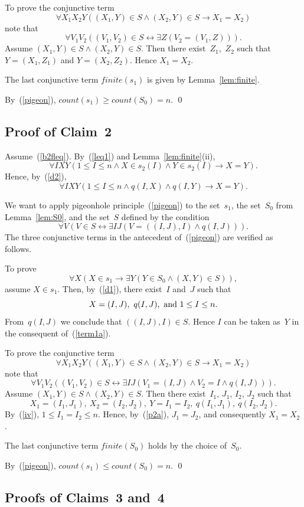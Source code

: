 \documentclass[11pt]{article}
\def\fnt{\mathit{finite}}
\def\lrar{\leftrightarrow}
\def\beq{\begin{equation}}
\def\eeq#1{\label{#1}\end{equation}}
\newcommand{\co}{\ensuremath{\mathit{count}}}
\begin{document}
\begin{adjustwidth}{-1cm}{-1cm}
To prove the conjunctive term
$$\forall X_1X_2Y((X_1,Y)\in S \land (X_2,Y)\in S \to X_1=X_2)$$
note that
$$\forall V_1V_2((V_1,V_2)\in S \lrar \exists Z(V_2=(V_1,Z))).$$
Assume $(X_1,Y)\in S \land (X_2,Y)\in S$.  Then there
exist~$Z_1$,~$Z_2$ such that $Y=(X_1,Z_1)$ and $Y=(X_2,Z_2)$.
Hence $X_1=X_2$.

The last conjunctive term $\fnt(s_1)$ is given by Lemma~\ref{lem:finite}.

By~(\ref{pigeon}), $\co(s_1)\geq \co(S_0)=n$.
\qed

\subsection{Proof of Claim~2}

Assume~(\ref{b2fleq}).  By~(\ref{leq1}) and Lemma~\ref{lem:finite}(ii),
$$\forall IXY(1\leq I\leq n \land X\in s_2(I) \land Y\in s_2(I) \to X=Y).$$
Hence, by~(\ref{d2}),
\beq
\forall IXY(1\leq I\leq n \land q(I,X) \land q(I,Y) \to X=Y).
\eeq{p2a}

We want to apply pigeonhole principle~(\ref{pigeon}) to the set~$s_1$, the
set~$S_0$ from Lemma~\ref{lem:S0}, and the set~$S$ defined by the condition
$$
\forall V(V\in S \lrar \exists IJ(V=((I,J),I)\land q(I,J))).
$$
The three conjunctive terms in the antecedent of~(\ref{pigeon}) are verified
as follows.

To prove
\beq
\forall X(X\in s_1 \to \exists Y (Y\in S_0 \land (X,Y)\in S)),
\eeq{term1a}
assume $X\in s_1$. Then, by~(\ref{d1}), there exist~$I$ and~$J$ such that
$$X=(I,J),\ q(I,J),\hbox{  and }1\leq I\leq n.$$
From~$q(I,J)$ we conclude that
$((I,J),I)\in S$.  Hence $I$ can be taken as~$Y$ in the consequent
of~(\ref{term1a}).

To prove the conjunctive term
$$\forall X_1X_2Y((X_1,Y)\in S \land (X_2,Y)\in S \to X_1=X_2)$$
note that
$$\forall V_1V_2((V_1,V_2)\in S \lrar
\exists IJ(V_1=(I,J) \land V_2=I \land q(I,J))).$$
Assume $(X_1,Y)\in S \land (X_2,Y)\in S$.  Then there
exist~$I_1$, $J_1$, $I_2$, $J_2$ such that
$$X_1=(I_1,J_1),\ X_2=(I_2,J_2),\ Y=I_1=I_2,\ q(I_1,J_1),\ q(I_2,J_2).$$
By~(\ref{iv}), $1\leq I_1=I_2\leq n$.
Hence, by~(\ref{p2a}), $J_1=J_2$, and consequently $X_1=X_2$.

The last conjunctive term $\fnt(S_0)$ holds by the choice of~$S_0$.

By~(\ref{pigeon}), $\co(s_1)\leq \co(S_0)=n$.
\qed

\subsection{Proofs of Claims~3 and~4}


\end{adjustwidth}
\end{document}
